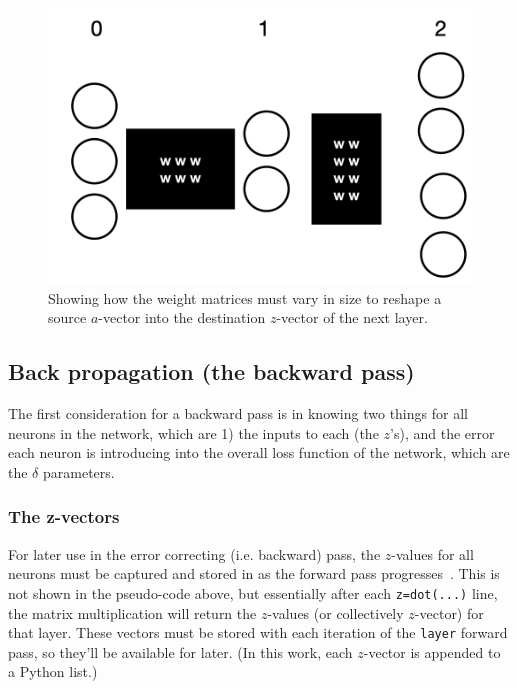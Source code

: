 \documentclass[12pt]{article}
\begin{document}
 \begin{figure}[h]
\begin{center}
\includegraphics[scale=0.3]{Figs/nn_reshape}
\caption{Showing how the weight matrices must vary in size to reshape a source $a$-vector into the destination $z$-vector of the next layer.}
\label{nn_reshape}
\end{center}
\end{figure}

\subsection{Back propagation (the backward pass)}

The first consideration for a backward pass is in knowing two things for all neurons in the network, which are 1) the inputs to each (the $z$'s), and the error each neuron is introducing into the overall loss function of the network, which are the $\delta$ parameters.

\subsubsection{The z-vectors}

For later use in the error correcting (i.e. backward) pass, the $z$-values for all neurons must be captured and stored in as the forward pass progresses~\cite{karpathy,pytorch_history_tracking}.   This is not shown in the pseudo-code above, but essentially after each {\tt z=dot(...)} line, the matrix multiplication will return the $z$-values (or collectively $z$-vector) for that layer. These vectors must be stored with each iteration of the {\tt layer} forward pass, so they'll be available for later.  (In this work, each $z$-vector is appended to a Python list.)
\end{document}
